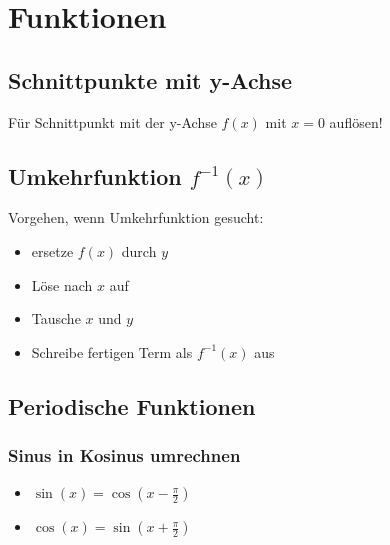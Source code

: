 \documentclass[12pt, a4paper]{scrreprt}
\begin{document}
\begin{figure}[H]
  \centering
  \hfill%
  \subfloat[Tangens]{}
\end{figure}

%   

\begin{figure}[H]
  \centering
  \subfloat[Logarithmusfunktionen]{}\hfill%
  \subfloat[Wurzelfunktion]{}
\end{figure}

\chapter{Funktionen}
\section{Schnittpunkte mit y-Achse}
Für Schnittpunkt mit der y-Achse \(f(x)\) mit \(x=0\) auflösen!

\section{Umkehrfunktion \(f^{-1}(x)\)}
Vorgehen, wenn Umkehrfunktion gesucht:

\begin{itemize}
\item ersetze \(f(x)\) durch \(y\)
\item Löse nach \(x\) auf
\item Tausche \(x\) und \(y\)
\item Schreibe fertigen Term als \(f^{-1}(x)\) aus
\end{itemize}

\section{Periodische Funktionen}

\subsection{Sinus in Kosinus umrechnen}
\begin{itemize}
\item \(\sin(x) = \cos(x - \frac{\pi}{2})\)
\item \(\cos(x) = \sin(x + \frac{\pi}{2})\)
\end{itemize}
\end{document}
